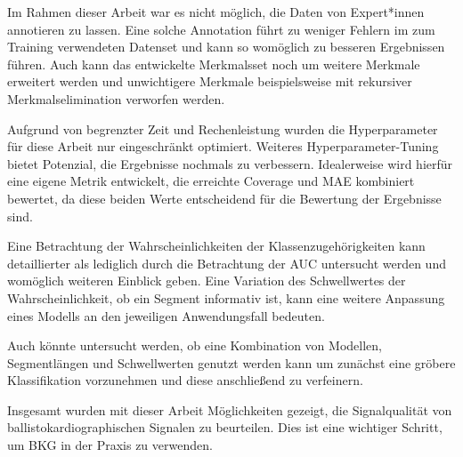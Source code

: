 Im Rahmen dieser Arbeit war es nicht möglich, die Daten von Expert*innen annotieren zu lassen. Eine solche Annotation führt zu weniger Fehlern im zum Training verwendeten Datenset und kann so womöglich zu besseren Ergebnissen führen. Auch kann das entwickelte Merkmalsset noch um weitere Merkmale erweitert werden und unwichtigere Merkmale beispielsweise mit rekursiver Merkmalselimination verworfen werden.

Aufgrund von begrenzter Zeit und Rechenleistung wurden die Hyperparameter für diese Arbeit nur eingeschränkt optimiert. Weiteres Hyperparameter-Tuning bietet Potenzial, die Ergebnisse nochmals zu verbessern. Idealerweise wird hierfür eine eigene Metrik entwickelt, die erreichte Coverage und \ac{MAE} kombiniert bewertet, da diese beiden Werte entscheidend für die Bewertung der Ergebnisse sind.

Eine Betrachtung der Wahrscheinlichkeiten der Klassenzugehörigkeiten kann detaillierter als lediglich durch die Betrachtung der \ac{AUC} untersucht werden und womöglich weiteren Einblick geben. Eine Variation des Schwellwertes der Wahrscheinlichkeit, ob ein Segment informativ ist, kann eine weitere Anpassung eines Modells an den jeweiligen Anwendungsfall bedeuten.

Auch könnte untersucht werden, ob eine Kombination von Modellen, Segmentlängen und Schwellwerten genutzt werden kann um zunächst eine gröbere Klassifikation vorzunehmen und diese anschließend zu verfeinern.

Insgesamt wurden mit dieser Arbeit Möglichkeiten gezeigt, die Signalqualität von ballistokardiographischen Signalen zu beurteilen. Dies ist eine wichtiger Schritt, um \ac{BKG} in der Praxis zu verwenden.



